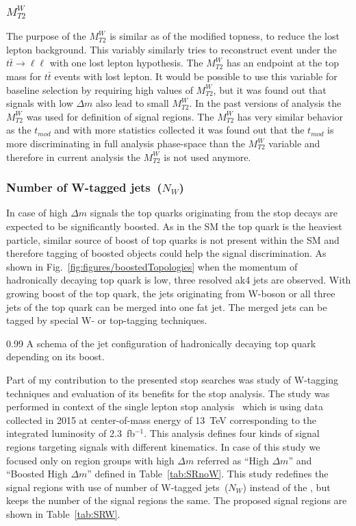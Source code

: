 \subsubsection{$M_{T2}^{W}$}

The purpose of the $M_{T2}^{W}$ is similar as of the modified topness, to reduce the lost lepton background. This variably similarly tries to reconstruct event under the $t \bar{t} \to \ell \ell$ with one lost lepton hypothesis. The $M_{T2}^{W}$ has an endpoint at the top mass for $t\bar{t}$ events with lost lepton. It would be possible to use this variable for baseline selection by requiring high values of $M_{T2}^{W}$, but it was found out that signals with low $\Delta m$ also lead to small $M_{T2}^{W}$. In the past versions of analysis the $M_{T2}^{W}$ was used for definition of signal regions. The $M_{T2}^{W}$ has very similar behavior as the $t_{mod}$ and with more statistics collected it was found out that the $t_{mod}$ is more discriminating in full analysis phase-space than the $M_{T2}^{W}$ variable and therefore in current analysis the $M_{T2}^{W}$ is not used anymore.


\subsubsection{Number of W-tagged jets~($N_{W}$)}

In case of high  $\Delta m$ signals the top quarks originating from the stop decays are expected to be significantly boosted. As in the SM the top quark is the heaviest particle, similar source of boost of top quarks is not present within the SM and therefore tagging of boosted objects could help the signal discrimination. As shown in Fig.~\ref{fig:figures/boostedTopologies} when the momentum of hadronically decaying top quark is low, three resolved ak4 jets are observed. With growing boost of the top quark, the jets originating from W-boson or all three jets of the top quark can be merged into one fat jet. The merged jets can be tagged by special W- or top-tagging techniques.

                 {0.99}       %
                 { A schema of the jet configuration of hadronically decaying top quark  depending on its boost. }


Part of my contribution to the presented stop searches was study of W-tagging techniques and evaluation of its benefits for the stop analysis. The study was performed in context of the single lepton stop analysis~\cite{Sirunyan:2016jpr} which is using data collected in 2015 at center-of-mass energy of 13~TeV  corresponding to the integrated luminosity of 2.3~fb$^{-1}$. This analysis defines four kinds of signal regions targeting signals with different kinematics. In case of this study we focused only on region groups with high $\Delta m $ referred as ``High $\Delta m$'' and ``Boosted High $\Delta m$'' defined in Table~\ref{tab:SRnoW}. This study redefines the signal regions with use of number of W-tagged jets~($N_{W}$) instead of the \MET, but keeps the number of the signal regions the same. The proposed signal regions are shown in Table~\ref{tab:SRW}.

